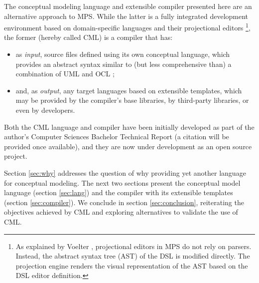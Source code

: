The conceptual modeling language and extensible compiler presented here are an alternative approach to MPS.
While the latter is a fully integrated development environment based on domain-specific languages and their projectional editors \footnote{As explained by Voelter \cite{voelter}, projectional editors in MPS do not rely on parsers.
Instead, the abstract syntax tree (AST) of the DSL is modified directly.
The projection engine renders the visual representation of the AST based on the DSL editor definition.},
the former (hereby called CML) is a compiler that has:
\begin{itemize}
\item as \emph{input}, source files defined using its own conceptual language,
which provides an abstract syntax similar to (but less comprehensive than) a combination of UML \cite{uml} and OCL \cite{ocl}; 
\item and, as \emph{output}, any target languages based on extensible templates,
which may be provided by the compiler's base libraries, by third-party libraries, or even by developers.
\end{itemize}

Both the CML language and compiler have been initially developed as part of the author's Computer Sciences Bachelor Technical Report (a citation will be provided once available),
and they are now under development \cite{cml-repo} as an open source project.

Section \ref{sec:why} addresses the question of why providing yet another language for conceptual modeling.
The next two sections present the conceptual model language (section \ref{sec:lang}) and the compiler with its extensible templates (section \ref{sec:compiler}).
We conclude in section \ref{sec:conclusion},
reiterating the objectives achieved by CML and exploring alternatives to validate the use of CML.
